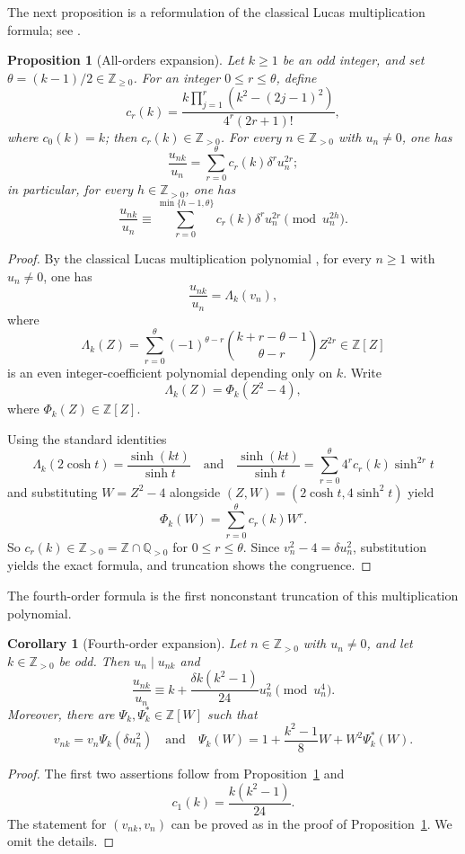 \documentclass[12pt]{amsart}
\numberwithin{equation}{section}
\newtheorem{proposition}[theorem]{Proposition}
\newtheorem{corollary}[theorem]{Corollary}
\theoremstyle{remark}
\theoremstyle{plain}
\newcommand{\Z}{\mathbb{Z}}
\newcommand{\Q}{\mathbb{Q}}
\begin{document}
The next proposition is a reformulation of the classical Lucas multiplication formula; see \cite[\S~2.2]{BW23}.
\begin{proposition}[All-orders expansion]\label{prop:lucas-all}
Let $k\geq1$ be an odd integer, and set $\theta=(k-1)/2\in\Z_{\geq0}$. For an integer $0\leq r\leq\theta$, define
\[
c_r(k)=\frac{k\prod_{j=1}^{r}\left(k^2-(2j-1)^2\right)}{4^r(2r+1)!},
\]
where $c_0(k)=k$; then $c_r(k)\in\Z_{>0}$. For every $n\in\Z_{>0}$ with $u_n\neq0$, one has
\[
\frac{u_{nk}}{u_n}=\sum_{r=0}^{\theta}c_r(k)\delta^r u_n^{2r};
\]
in particular, for every $h\in\Z_{>0}$, one has
\[
\frac{u_{nk}}{u_n}\equiv\sum_{r=0}^{\min\{h-1,\theta\}}c_r(k)\delta^r u_n^{2r}\pmod{u_n^{2h}}.
\]
\end{proposition}
\begin{proof}
By the classical Lucas multiplication polynomial \cite[(2.35)]{BW23}, for every $n\ge1$ with $u_n\neq0$, one has
\[
\frac{u_{nk}}{u_n}=\Lambda_k(v_n),
\]
where
\[
\Lambda_k(Z)=\sum_{r=0}^{\theta}(-1)^{\theta-r}\binom{k+r-\theta-1}{\theta-r}Z^{2r}\in\Z[Z]
\]
is an even integer-coefficient polynomial depending only on $k$. Write
\[
\Lambda_k(Z)=\Phi_k(Z^2-4),
\]
where $\Phi_k(Z)\in\Z[Z]$.

Using the standard identities
\[
\Lambda_k(2\cosh t) = \frac{\sinh(kt)}{\sinh t}\quad\text{and}\quad\frac{\sinh(kt)}{\sinh t}=\sum_{r=0}^{\theta}4^rc_r(k)\sinh^{2r}t
\]
and substituting $W=Z^2-4$ alongside $(Z,W)=(2\cosh t,4\sinh^2t)$ yield
\[
\Phi_k(W)=\sum_{r=0}^{\theta}c_r(k)W^r.
\]
So $c_r(k)\in\Z_{>0}=\Z\cap\Q_{>0}$ for $0\leq r\leq\theta$. Since $v_n^2-4=\delta u_n^2$, substitution yields the exact formula, and truncation shows the congruence.
\end{proof}

The fourth-order formula is the first nonconstant truncation of this multiplication polynomial.
\begin{corollary}[Fourth-order expansion]\label{cor:lucas4}
Let $n\in\Z_{>0}$ with $u_n\neq0$, and let $k\in\Z_{>0}$ be odd. Then $u_n\mid u_{nk}$ and
\[
\frac{u_{nk}}{u_n}\equiv k+\frac{\delta k(k^2-1)}{24}u_n^2\pmod{u_n^4}.
\]
Moreover, there are $\Psi_k, \Psi_k^*\in\Z[W]$ such that
\[
v_{nk}=v_n\Psi_k(\delta u_n^2)\quad\text{and}\quad\Psi_k(W)=1+\frac{k^2-1}{8}W+W^2\Psi_k^*(W).
\]
\end{corollary}
\begin{proof}
The first two assertions follow from Proposition~\ref{prop:lucas-all} and
\[
c_1(k)=\frac{k(k^2-1)}{24}.
\]
The statement for $(v_{nk},v_n)$ can be proved as in the proof of Proposition~\ref{prop:lucas-all}. We omit the details.
\end{proof}
\end{document}

